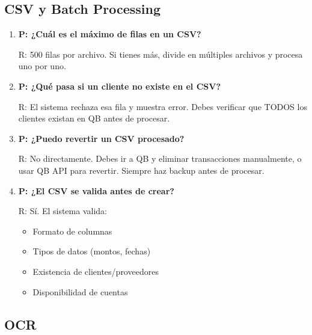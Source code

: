\documentclass[12pt,oneside]{article}
\begin{document}
\subsection{CSV y Batch Processing}

\begin{enumerate}
    \item \textbf{P: ¿Cuál es el máximo de filas en un CSV?}
    
    R: 500 filas por archivo. Si tienes más, divide en múltiples archivos y procesa uno por uno.
    
    \item \textbf{P: ¿Qué pasa si un cliente no existe en el CSV?}
    
    R: El sistema rechaza esa fila y muestra error. Debes verificar que TODOS los clientes existan en QB antes de procesar.
    
    \item \textbf{P: ¿Puedo revertir un CSV procesado?}
    
    R: No directamente. Debes ir a QB y eliminar transacciones manualmente, o usar QB API para revertir. Siempre haz backup antes de procesar.
    
    \item \textbf{P: ¿El CSV se valida antes de crear?}
    
    R: Sí. El sistema valida:
    \begin{itemize}
        \item Formato de columnas
        \item Tipos de datos (montos, fechas)
        \item Existencia de clientes/proveedores
        \item Disponibilidad de cuentas
    \end{itemize}
    
\end{enumerate}

\subsection{OCR}
\end{document}
